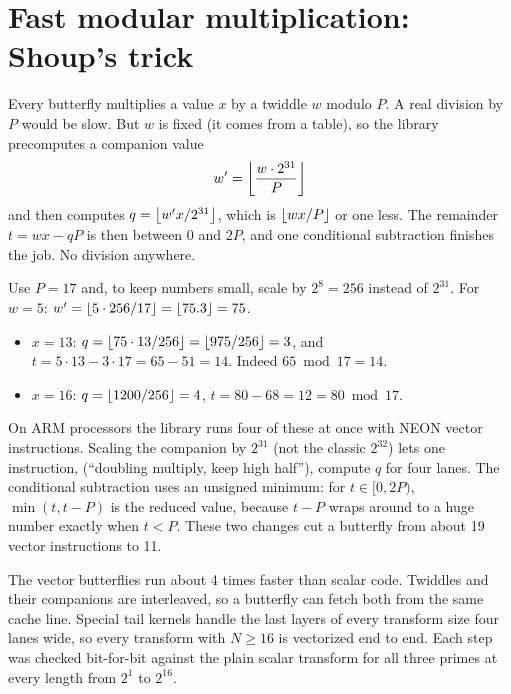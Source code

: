 \section{Fast modular multiplication: Shoup's trick}

Every butterfly multiplies a value $x$ by a twiddle $w$ modulo $P$. A real division by $P$
would be slow. But $w$ is fixed (it comes from a table), so the library precomputes a
companion value
\[
w' = \left\lfloor \frac{w \cdot 2^{31}}{P} \right\rfloor
\]
and then computes $q = \left\lfloor w' x / 2^{31} \right\rfloor$, which is $\left\lfloor wx/P \right\rfloor$ or one less. The
remainder $t = wx - qP$ is then between $0$ and $2P$, and one conditional subtraction
finishes the job. No division anywhere.

\begin{example}
Use $P = 17$ and, to keep numbers small, scale by $2^8 = 256$ instead of $2^{31}$.
For $w = 5$: $w' = \left\lfloor 5 \cdot 256 / 17 \right\rfloor = \left\lfloor 75.3 \right\rfloor = 75$.
\begin{itemize}
  \item $x = 13$: $q = \left\lfloor 75 \cdot 13 / 256 \right\rfloor = \left\lfloor 975/256 \right\rfloor = 3$, and
        $t = 5 \cdot 13 - 3 \cdot 17 = 65 - 51 = 14$. Indeed $65 \bmod 17 = 14$.
  \item $x = 16$: $q = \left\lfloor 1200/256 \right\rfloor = 4$, $t = 80 - 68 = 12 = 80 \bmod 17$.
\end{itemize}
\end{example}

On ARM processors the library runs four of these at once with NEON vector instructions.
Scaling the companion by $2^{31}$ (not the classic $2^{32}$) lets one instruction,
 (``doubling multiply, keep high half''), compute $q$ for four lanes.
The conditional subtraction uses an unsigned minimum: for $t \in [0, 2P)$, $\min(t, t - P)$ is
the reduced value, because $t - P$ wraps around to a huge number exactly when $t < P$.
These two changes cut a butterfly from about 19 vector instructions to 11.

\begin{perfnote}
The vector butterflies run about 4 times faster than scalar code. Twiddles and their
companions are interleaved, so a butterfly can fetch both from the same cache line. Special tail kernels
handle the last layers of every transform size four lanes wide, so every transform with
$N \ge 16$ is vectorized end to end. Each step was checked bit-for-bit against the plain
scalar transform for all three primes at every length from $2^1$ to $2^{16}$.
\end{perfnote}

